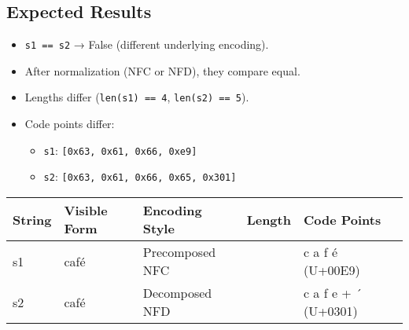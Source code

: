 \documentclass[
  letterpaper,
  DIV=11,
  numbers=noendperiod]{scrreprt}
\providecommand{\tightlist}{%
  \setlength{\itemsep}{0pt}\setlength{\parskip}{0pt}}
\begin{document}
\subsection{Expected Results}\label{expected-results-7}

\begin{itemize}
\item
  \texttt{s1\ ==\ s2} → False (different underlying encoding).
\item
  After normalization (NFC or NFD), they compare equal.
\item
  Lengths differ (\texttt{len(s1)\ ==\ 4}, \texttt{len(s2)\ ==\ 5}).
\item
  Code points differ:

  \begin{itemize}
  \tightlist
  \item
    \texttt{s1}: \texttt{{[}0x63,\ 0x61,\ 0x66,\ 0xe9{]}}
  \item
    \texttt{s2}: \texttt{{[}0x63,\ 0x61,\ 0x66,\ 0x65,\ 0x301{]}}
  \end{itemize}
\end{itemize}

\begin{longtable}[]{@{}
  >{\raggedright\arraybackslash}p{}
  >{\raggedright\arraybackslash}p{}
  >{\raggedright\arraybackslash}p{}
  >{\raggedright\arraybackslash}p{}
  >{\raggedright\arraybackslash}p{}@{}}
\toprule\noalign{}
\begin{minipage}[b]{\linewidth}\raggedright
String
\end{minipage} & \begin{minipage}[b]{\linewidth}\raggedright
Visible Form
\end{minipage} & \begin{minipage}[b]{\linewidth}\raggedright
Encoding Style
\end{minipage} & \begin{minipage}[b]{\linewidth}\raggedright
Length
\end{minipage} & \begin{minipage}[b]{\linewidth}\raggedright
Code Points
\end{minipage} \\
\midrule\noalign{}
\endhead
\bottomrule\noalign{}
\endlastfoot
s1 & café & Precomposed NFC & 4 & c a f é (U+00E9) \\
s2 & café & Decomposed NFD & 5 & c a f e + ´ (U+0301) \\
\end{longtable}
\end{document}
